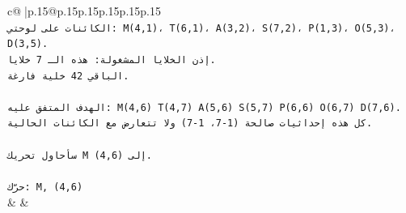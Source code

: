 \documentclass{article}
\begin{document}
{\begin{supertabular}{c@{$\;$}|p{.15\linewidth}@{}p{.15\linewidth}p{.15\linewidth}p{.15\linewidth}p{.15\linewidth}p{.15\linewidth}}
{{{\\ 
\texttt{الكائنات على لوحتي: M(4,1)، T(6,1)، A(3,2)، S(7,2)، P(1,3)، O(5,3)، D(3,5).} \\
\texttt{إذن الخلايا المشغولة: هذه الـ 7 خلايا.} \\
\texttt{الباقي 42 خلية فارغة.} \\
\\ 
\texttt{الهدف المتفق عليه: M(4,6) T(4,7) A(5,6) S(5,7) P(6,6) O(6,7) D(7,6).} \\
\texttt{كل هذه إحداثيات صالحة (1{-}7، 1{-}7) ولا تتعارض مع الكائنات الحالية.} \\
\\ 
\texttt{سأحاول تحريك M إلى (4,6).} \\
\\ 
\texttt{حرّك: M, (4,6)} \\
            }
        }
    }
    & & \\ \\


\end{supertabular}}
\end{document}
